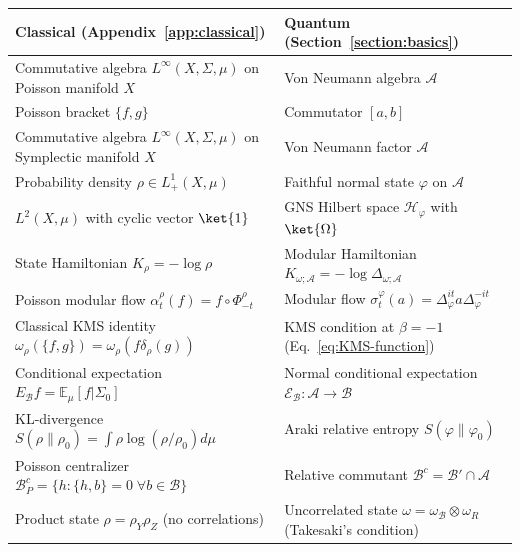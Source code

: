 \documentclass[a4paper,11pt]{article}
\theoremstyle{definition}
\theoremstyle{remark}
\newcommand{\mA}{\mathcal{A}}
\newcommand{\mB}{\mathcal{B}}
\newcommand{\mH}{\mathcal{H}}
\newcommand{\mE}{\mathcal{E}}
\begin{document}
 
\begingroup\color{blue}
\begin{table}[ht]
\centering
\renewcommand{\arraystretch}{1.35}
\small
\begin{tabular}{@{}p{6.2cm}p{6.8cm}@{}}
\toprule
\textbf{Classical (Appendix~\ref{app:classical})} & \textbf{Quantum (Section~\ref{section:basics})} \\
\midrule
Commutative algebra $L^\infty(X,\Sigma,\mu)$ on Poisson manifold $X$
  & Von Neumann algebra $\mA$  \\
   Poisson bracket $\{f,g\}$ & Commutator $[a,b]$\\
Commutative algebra $L^\infty(X,\Sigma,\mu)$ on Symplectic manifold $X$
  & Von Neumann factor $\mA$  \\
Probability density $\rho\in L^1_+(X,\mu)$
  & Faithful normal state $\varphi$ on $\mA$ \\
$L^2(X,\mu)$ with cyclic vector $\ket{1}$
  & GNS Hilbert space $\mH_\varphi$ with $\ket{\Omega}$ \\
State Hamiltonian $K_\rho=-\log\rho$
  & Modular Hamiltonian $K_{\omega;\mA}=-\log\Delta_{\omega;\mA}$ \\
Poisson modular flow $\alpha_t^\rho(f)=f\circ\Phi_{-t}^\rho$
  & Modular flow $\sigma_t^\varphi(a)=\Delta_\varphi^{it}a\Delta_\varphi^{-it}$ \\
Classical KMS identity $\omega_\rho(\{f,g\})=\omega_\rho(f\delta_\rho(g))$
  & KMS condition at $\beta=-1$ (Eq.~\ref{eq:KMS-function}) \\
Conditional expectation $E_\mB f=\mathbb{E}_\mu[f|\Sigma_0]$
  & Normal conditional expectation $\mE_\mB:\mA\to\mB$ \\
KL-divergence $S(\rho\|\rho_0)=\int\rho\log(\rho/\rho_0)d\mu$
  & Araki relative entropy $S(\varphi\|\varphi_0)$ \\
Poisson centralizer $\mB_P^c=\{h:\{h,b\}=0\;\forall b\in\mB\}$
  & Relative commutant $\mB^c=\mB'\cap\mA$ \\
Product state $\rho=\rho_Y\rho_Z$ (no correlations)
  & Uncorrelated state $\omega=\omega_\mB\otimes\omega_R$ (Takesaki's condition) \\

\end{tabular}
\end{table}
\end{document}
